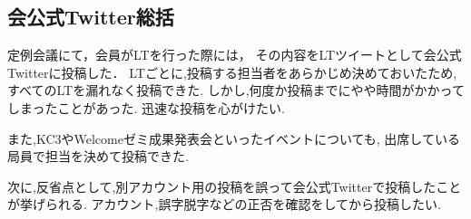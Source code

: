 \subsection*{会公式Twitter総括}


定例会議にて，会員がLTを行った際には，
その内容をLTツイートとして会公式Twitterに投稿した．
LTごとに,投稿する担当者をあらかじめ決めておいたため,
すべてのLTを漏れなく投稿できた.
しかし,何度か投稿までにやや時間がかかってしまったことがあった.
迅速な投稿を心がけたい.

また,KC3やWelcomeゼミ成果発表会といったイベントについても,
出席している局員で担当を決めて投稿できた.

次に,反省点として,別アカウント用の投稿を誤って会公式Twitterで投稿したことが挙げられる.
アカウント,誤字脱字などの正否を確認をしてから投稿したい.
